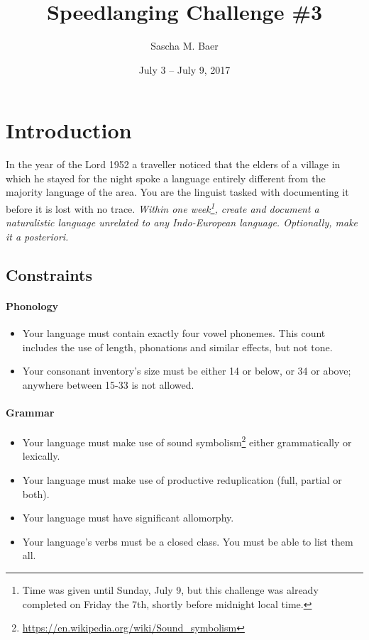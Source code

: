 \documentclass{article}
\title{Speedlanging Challenge \#3\\ \langname{}}
\author{Sascha M. Baer}
\date{July 3 – July 9, 2017}
\begin{document}
\maketitle
\newpage
\tableofcontents
\newpage

\section{Introduction}

In the year of the Lord 1952 a traveller noticed that the elders of a village in which he stayed for the night spoke a language entirely different from the majority language of the area. You are the linguist tasked with documenting it before it is lost with no trace. \emph{Within one week\footnote{Time was given until Sunday, July 9, but this challenge was already completed on Friday the 7th, shortly before midnight local time.}, create and document a naturalistic language unrelated to any Indo-European language. Optionally, make it a posteriori.}


\subsection{Constraints}

\paragraph{Phonology}
\begin{itemize}
\item Your language must contain exactly four vowel phonemes. This count includes the use of length, phonations and similar effects, but not tone.
\item Your consonant inventory’s size must be either 14 or below, or 34 or above; anywhere between 15-33 is not allowed.
\end{itemize}

\paragraph{Grammar}
\begin{itemize}
\item Your language must make use of sound symbolism\footnote{\url{https://en.wikipedia.org/wiki/Sound_symbolism}} either grammatically or lexically.
\item Your language must make use of productive reduplication (full, partial or both).
\item Your language must have significant allomorphy.
\item Your language’s verbs must be a closed class. You must be able to list them all.
\end{itemize}
\end{document}
